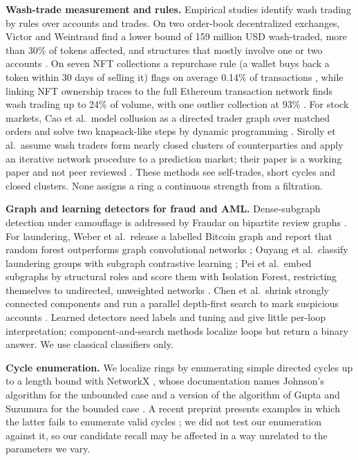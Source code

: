 \documentclass[conference]{IEEEtran}
\begin{document}
\textbf{Wash-trade measurement and rules.} Empirical studies identify wash trading by rules over accounts and trades. On two order-book decentralized exchanges, Victor and Weintraud find a lower bound of 159 million USD wash-traded, more than 30\% of tokens affected, and structures that mostly involve one or two accounts \cite{victor2021wash}. On seven NFT collections a repurchase rule (a wallet buys back a token within 30 days of selling it) flags on average 0.14\% of transactions \cite{liu2023nft}, while linking NFT ownership traces to the full Ethereum transaction network finds wash trading up to 24\% of volume, with one outlier collection at 93\% \cite{tosic2025beyond}. For stock markets, Cao et al.\ model collusion as a directed trader graph over matched orders and solve two knapsack-like steps by dynamic programming \cite{cao2016wash}. Sirolly et al.\ assume wash traders form nearly closed clusters of counterparties and apply an iterative network procedure to a prediction market; their paper is a working paper and not peer reviewed \cite{sirolly2025network}. These methods see self-trades, short cycles and closed clusters. None assigns a ring a continuous strength from a filtration.

\textbf{Graph and learning detectors for fraud and AML.} Dense-subgraph detection under camouflage is addressed by Fraudar on bipartite review graphs \cite{hooi2017fraudar}. For laundering, Weber et al.\ release a labelled Bitcoin graph and report that random forest outperforms graph convolutional networks \cite{weber2019aml}; Ouyang et al.\ classify laundering groups with subgraph contrastive learning \cite{ouyang2024bitchetg}; Pei et al.\ embed subgraphs by structural roles and score them with Isolation Forest, restricting themselves to undirected, unweighted networks \cite{pei2020sade}. Chen et al.\ shrink strongly connected components and run a parallel depth-first search to mark suspicious accounts \cite{chen2023parallel}. Learned detectors need labels and tuning and give little per-loop interpretation; component-and-search methods localize loops but return a binary answer. We use classical classifiers only.

\textbf{Cycle enumeration.} We localize rings by enumerating simple directed cycles up to a length bound with NetworkX \cite{networkx_simple_cycles}, whose documentation names Johnson's algorithm for the unbounded case \cite{johnson1975circuits} and a version of the algorithm of Gupta and Suzumura for the bounded case \cite{gupta2021bounded}. A recent preprint presents examples in which the latter fails to enumerate valid cycles \cite{bauernoppel2025bounded}; we did not test our enumeration against it, so our candidate recall may be affected in a way unrelated to the parameters we vary.
\end{document}

